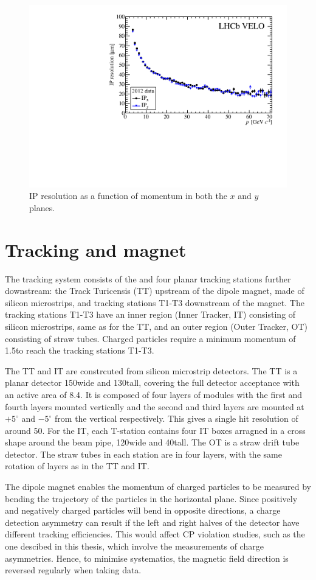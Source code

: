 \begin{figure}
\centering
\includegraphics[width=0.5\linewidth]{figures/detector/IPRes-Vs-P-CompareIPxIPy-2012.pdf}
\caption{IP resolution as a function of momentum in both the $x$ and $y$ planes.}
\label{veloperformance}
\end{figure}

\section{Tracking and magnet}

The \lhcb tracking system consists of the \velo and four planar tracking stations further downstream: the Track Turicensis (TT) upstream of the dipole magnet, made of silicon microstrips, and tracking stations T1-T3 downstream of the magnet. The tracking stations T1-T3 have an inner region (Inner Tracker, IT) consisting of silicon microstrips, same as for the TT, and an outer region (Outer Tracker, OT) consisting of straw tubes. Charged particles require a minimum momentum of 1.5\gevc to reach the tracking stations T1-T3.

The TT and IT are constrcuted from silicon microstrip detectors. The TT is a planar detector 150\cm wide and 130\cm tall, covering the full detector acceptance with an active area of 8.4\ma. It is composed of four layers of modules with the first and fourth layers mounted vertically and the second and third layers are mounted at $+5^{\circ}$ and $-5^{\circ}$ from the vertical respectively. This gives a single hit resolution of around 50\mum. For the IT, each T-station contains four IT boxes arragned in a cross shape around the beam pipe, 120\cm wide and 40\cm tall. The OT is a straw drift tube detector. The straw tubes in each station are in four layers, with the same rotation of layers as in the TT and IT.

The dipole magnet enables the momentum of charged particles to be measured by bending the trajectory of the particles in the horizontal plane. Since positively and negatively charged particles will bend in opposite directions, a charge detection asymmetry can result if the left and right halves of the detector have different tracking efficiencies. This would affect CP violation studies, such as the one descibed in this thesis, which involve the measurements of charge asymmetries. Hence, to minimise systematics, the magnetic field direction is reversed regularly when taking data.

